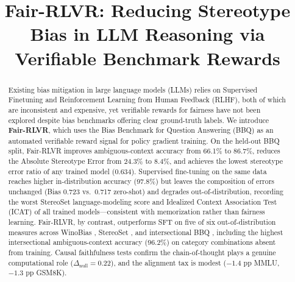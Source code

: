 \documentclass[conference]{IEEEtran}
\begin{document}
\title{Fair-RLVR: Reducing Stereotype Bias in LLM Reasoning via Verifiable Benchmark Rewards}

\author{
}

\maketitle

\begin{abstract}
Existing bias mitigation in large language models (LLMs) relies on Supervised Finetuning and Reinforcement Learning from Human Feedback (RLHF), both of which are inconsistent and expensive, yet verifiable rewards for fairness have not been explored despite bias benchmarks offering clear ground-truth labels. We introduce \textbf{Fair-RLVR}, which uses the Bias Benchmark for Question Answering (BBQ) \cite{bbq} as an automated verifiable reward signal for policy gradient training. On the held-out BBQ split, Fair-RLVR improves ambiguous-context accuracy from 66.1\% to 86.7\%, reduces the Absolute Stereotype Error from 24.3\% to 8.4\%, and achieves the lowest stereotype error ratio of any trained model (0.634). Supervised fine-tuning on the same data reaches higher in-distribution accuracy (97.8\%) but leaves the composition of errors unchanged (Bias 0.723 vs.\ 0.717 zero-shot) and degrades out-of-distribution, recording the worst StereoSet language-modeling score and Idealized Context Association Test (ICAT) of all trained models---consistent with memorization rather than fairness learning. Fair-RLVR, by contrast, outperforms SFT on five of six out-of-distribution measures across WinoBias \cite{winobias}, StereoSet \cite{stereoset}, and intersectional BBQ \cite{intersectionalbbq}, including the highest intersectional ambiguous-context accuracy (96.2\%) on category combinations absent from training. Causal faithfulness tests confirm the chain-of-thought plays a genuine computational role ($\Delta_{\text{null}}=0.22$), and the alignment tax is modest ($-1.4$ pp MMLU, $-1.3$ pp GSM8K).
\end{abstract}
\end{document}
